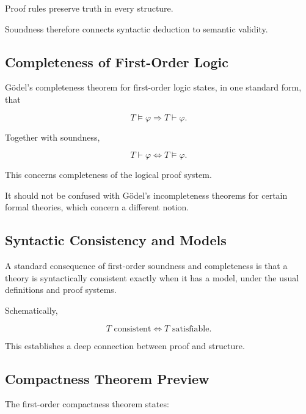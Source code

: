 Proof rules preserve truth in every structure.

Soundness therefore connects syntactic deduction to semantic validity.

\subsection{Completeness of First-Order Logic}
\label{subsec:first-order-completeness}

Gödel's completeness theorem for first-order logic states, in one standard
form, that

\[
\boxed{
T\models\varphi
\Longrightarrow
T\vdash\varphi.
}
\]

Together with soundness,

\[
\boxed{
T\vdash\varphi
\iff
T\models\varphi.
}
\]

This concerns completeness of the logical proof system.

It should not be confused with Gödel's incompleteness theorems for certain
formal theories, which concern a different notion.

\subsection{Syntactic Consistency and Models}
\label{subsec:consistency-and-models}

A standard consequence of first-order soundness and completeness is that
a theory is syntactically consistent exactly when it has a model, under the
usual definitions and proof systems.

Schematically,

\[
\boxed{
T
\text{ consistent}
\iff
T
\text{ satisfiable}.
}
\]

This establishes a deep connection between proof and structure.

\subsection{Compactness Theorem Preview}
\label{subsec:compactness-preview}

The first-order compactness theorem states:

